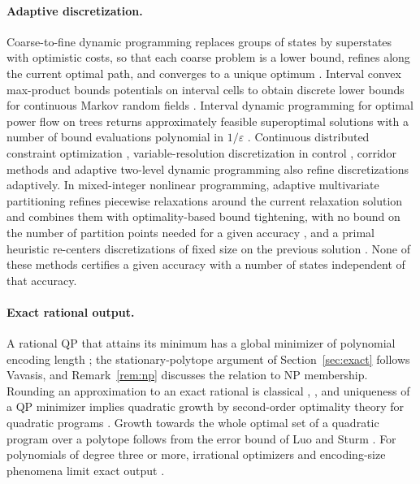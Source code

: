 \paragraph{Adaptive discretization.}
Coarse-to-fine dynamic programming replaces groups of states by superstates
with optimistic costs, so that each coarse problem is a lower bound, refines
along the current optimal path, and converges to a unique optimum
\cite{Raphael2001,FelzenszwalbMcAllester2007}. Interval convex max-product
bounds potentials on interval cells to obtain discrete lower bounds for
continuous Markov random fields \cite{PengEtAl2011}. Interval dynamic
programming for optimal power flow on trees returns approximately feasible
superoptimal solutions with a number of bound evaluations polynomial in
$1/\varepsilon$ \cite[Theorem~2]{DvijothamEtAl2017}. Continuous distributed
constraint optimization \cite{HoangEtAl2020,TroullinosEtAl2022},
variable-resolution discretization in control \cite{MunosMoore2002}, corridor
methods \cite{HeidariEtAl1971} and adaptive two-level dynamic programming
\cite{LeaverFayKuhlmanSnoeyink2005} also refine discretizations adaptively.
In mixed-integer nonlinear programming, adaptive multivariate partitioning
refines piecewise relaxations around the current relaxation solution and
combines them with optimality-based bound tightening, with no bound on the
number of partition points needed for a given accuracy
\cite{NagarajanEtAl2019}, and a primal heuristic re-centers discretizations
of fixed size on the previous solution \cite{GupteKosterKuhnke2022}. None of
these methods certifies a given accuracy with a number of states independent
of that accuracy.

\paragraph{Exact rational output.}
A rational QP that attains its minimum has a global minimizer of polynomial
encoding length \cite{Vavasis1990,DelPiaDeyMolinaro2017}; the
stationary-polytope argument of Section~\ref{sec:exact} follows Vavasis, and
Remark~\ref{rem:np} discusses the relation to NP membership. Rounding an
approximation to an exact rational is classical
\cite[Section~5.1]{GrotschelLovaszSchrijver1988}, \cite{KozlovTarasovKhachiyan1980},
and uniqueness of a QP minimizer implies quadratic growth by second-order
optimality theory for quadratic programs \cite{Contesse1980}. Growth towards
the whole optimal set of a quadratic program over a polytope follows from the
error bound of Luo and Sturm \cite[Theorem~3.3]{LuoSturm2000}. For polynomials
of degree three or more, irrational optimizers and encoding-size phenomena
limit exact output \cite{BienstockDelPiaHildebrand2023}.

